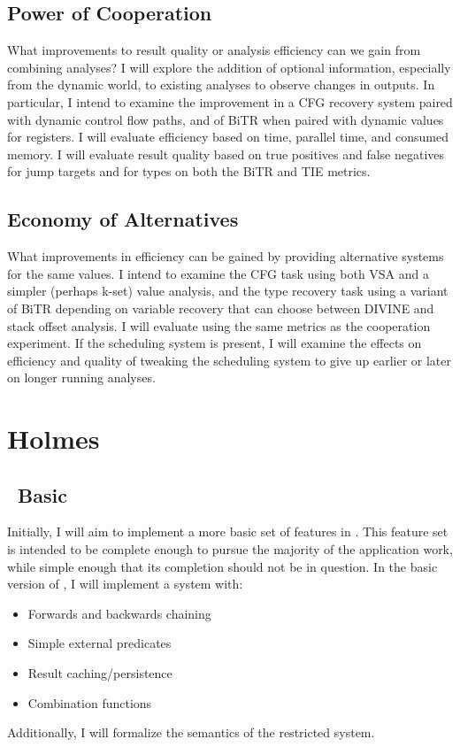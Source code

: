 \subsection{Power of Cooperation}
What improvements to result quality or analysis efficiency can we gain from combining analyses?
I will explore the addition of optional information, especially from the dynamic world, to existing analyses to observe changes in outputs.
In particular, I intend to examine the improvement in a CFG recovery system paired with dynamic control flow paths, and of BiTR when paired with dynamic values for registers.
I will evaluate efficiency based on time, parallel time, and consumed memory.
I will evaluate result quality based on true positives and false negatives for jump targets and for types on both the BiTR and TIE metrics\cite{bitr, tie}.
\subsection{Economy of Alternatives}
What improvements in efficiency can be gained by providing alternative systems for the same values.
I intend to examine the CFG task using both VSA and a simpler (perhaps k-set) value analysis, and the type recovery task using a variant of BiTR depending on variable recovery that can choose between DIVINE and stack offset analysis.
I will evaluate using the same metrics as the cooperation experiment.
If the scheduling system is present, I will examine the effects on efficiency and quality of tweaking the scheduling system to give up earlier or later on longer running analyses.

\section{Holmes}
\subsection{\sysname\ Basic}
\label{sec:holmesBasic}
Initially, I will aim to implement a more basic set of features in \sysname.
This feature set is intended to be complete enough to pursue the majority of the application work, while simple enough that its completion should not be in question.
In the basic version of \sysname, I will implement a system with:
\begin{itemize}
\item Forwards and backwards chaining
\item Simple external predicates
\item Result caching/persistence
\item Combination functions
\end{itemize}
Additionally, I will formalize the semantics of the restricted system.

